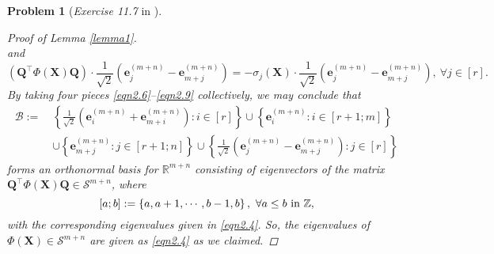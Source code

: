\documentclass[11pt]{article}
\newtheorem{problem}{Problem}
\numberwithin{equation}{problem}
\begin{document}
\begin{problem} [\emph{Exercise 11.7} in \cite{calafiore2014optimization}]
{\begin{proof} [Proof of Lemma \ref{lemma1}]
\begin{equation}
\end{equation}
and 
\begin{equation}
    \label{eqn2.9}
    \left( \mathbf{Q}^{\top} \Phi (\mathbf{X}) \mathbf{Q} \right) \cdot \frac{1}{\sqrt{2}}
    \left( \mathbf{e}_{j}^{(m+n)} - \mathbf{e}_{m+j}^{(m+n)} \right) = 
    - \sigma_j (\mathbf{X}) \cdot \frac{1}{\sqrt{2}}
    \left( \mathbf{e}_{j}^{(m+n)} - \mathbf{e}_{m+j}^{(m+n)} \right),\ \forall j \in [r].
\end{equation}
By taking four pieces \eqref{eqn2.6}--\eqref{eqn2.9} collectively, we may conclude that
\begin{equation*}
    \begin{split}
        \mathcal{B} := \ &
        \left\{ \frac{1}{\sqrt{2}}
        \left( \mathbf{e}_{i}^{(m+n)} + \mathbf{e}_{m+i}^{(m+n)} \right) : i \in [r] \right\}
        \cup \left\{ \mathbf{e}_{i}^{(m+n)} : i \in \left[ r+1; m \right] \right\} \\
        &\cup \left\{ \mathbf{e}_{m+j}^{(m+n)} : j \in \left[ r+1; n \right] \right\}
        \cup \left\{ \frac{1}{\sqrt{2}}
        \left( \mathbf{e}_{j}^{(m+n)} - \mathbf{e}_{m+j}^{(m+n)} \right) : j \in [r] \right\}
    \end{split}
\end{equation*}
forms an orthonormal basis for $\mathbb{R}^{m+n}$ consisting of eigenvectors of the matrix $\mathbf{Q}^{\top} \Phi (\mathbf{X}) \mathbf{Q} \in \mathcal{S}^{m+n}$, where
\begin{equation*}
    \left[ a; b \right] := \left\{ a, a+1, \cdots, b-1, b \right\},\ \forall a \leq b \textnormal{ in } \mathbb{Z},
\end{equation*}
with the corresponding eigenvalues given in \eqref{eqn2.4}. So, the eigenvalues of $\Phi (\mathbf{X}) \in \mathcal{S}^{m+n}$ are given as \eqref{eqn2.4} as we claimed.

\end{proof}

}
\end{problem}
\end{document}
